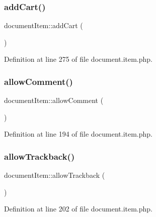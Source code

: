\mbox{\label{classdocumentItem_af32d9aba9797f3a913ac66031304ee92}} 
\subsubsection{\texorpdfstring{add\+Cart()}{addCart()}}
{\footnotesize\ttfamily document\+Item\+::add\+Cart (\begin{DoxyParamCaption}{ }\end{DoxyParamCaption})}



Definition at line 275 of file document.\+item.\+php.

\mbox{\label{classdocumentItem_a6d266a19a4703f5282b030d27e7e525a}} 
\subsubsection{\texorpdfstring{allow\+Comment()}{allowComment()}}
{\footnotesize\ttfamily document\+Item\+::allow\+Comment (\begin{DoxyParamCaption}{ }\end{DoxyParamCaption})}



Definition at line 194 of file document.\+item.\+php.

\mbox{\label{classdocumentItem_a701624de548b08fd26b129bba0acbf3d}} 
\subsubsection{\texorpdfstring{allow\+Trackback()}{allowTrackback()}}
{\footnotesize\ttfamily document\+Item\+::allow\+Trackback (\begin{DoxyParamCaption}{ }\end{DoxyParamCaption})}



Definition at line 202 of file document.\+item.\+php.

\mbox{\label{classdocumentItem_abac6ff72ec8faf238215dedb1df85569}} 
